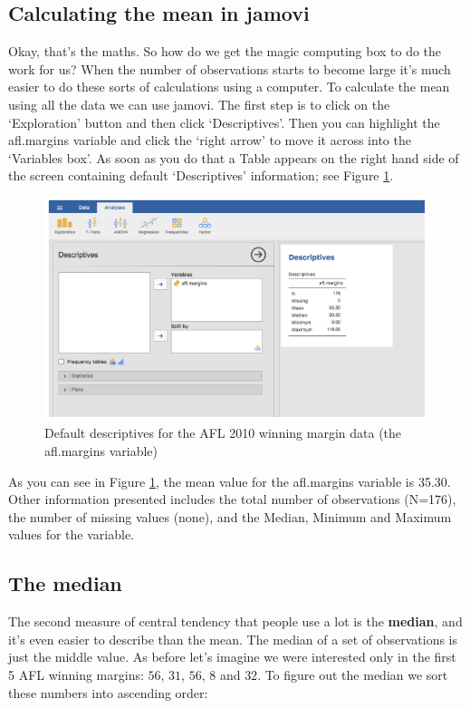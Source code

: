 \documentclass[
]{book}
\begin{document}
\hypertarget{calculating-the-mean-in-jamovi}{%
\subsection{Calculating the mean in jamovi}\label{calculating-the-mean-in-jamovi}}

Okay, that's the maths. So how do we get the magic computing box to do the work for us? When the number of observations starts to become large it's much easier to do these sorts of calculations using a computer. To calculate the mean using all the data we can use jamovi. The first step is to click on the `Exploration' button and then click `Descriptives'. Then you can highlight the afl.margins variable and click the `right arrow' to move it across into the `Variables box'. As soon as you do that a Table appears on the right hand side of the screen containing default `Descriptives' information; see Figure \ref{fig:fig4-3}.

\begin{figure}
\includegraphics[width=0.9\linewidth]{images/Figure10} \caption{Default descriptives for the AFL 2010 winning margin data (the afl.margins variable)}\label{fig:fig4-3}
\end{figure}

As you can see in Figure \ref{fig:fig4-3}, the mean value for the afl.margins variable is 35.30. Other information presented includes the total number of observations (N=176), the number of missing values (none), and the Median, Minimum and Maximum values for the variable.

\hypertarget{the-median}{%
\subsection{The median}\label{the-median}}

The second measure of central tendency that people use a lot is the \textbf{median}, and it's even easier to describe than the mean. The median of a set of observations is just the middle value. As before let's imagine we were interested only in the first 5 AFL winning margins: \(56\), \(31\), \(56\), \(8\) and \(32\). To figure out the median we sort these numbers into ascending order:
\end{document}
